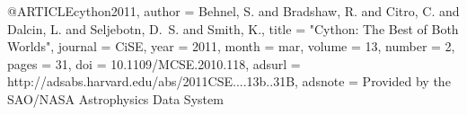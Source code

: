 
@ARTICLE{cython2011,
   author = {{Behnel}, S. and {Bradshaw}, R. and {Citro}, C. and {Dalcin}, L. and
	{Seljebotn}, D.~S. and {Smith}, K.},
    title = "{Cython: The Best of Both Worlds}",
  journal = {CiSE},
     year = 2011,
    month = mar,
   volume = 13,
   number = 2,
    pages = {31},
      doi = {10.1109/MCSE.2010.118},
   adsurl = {http://adsabs.harvard.edu/abs/2011CSE....13b..31B},
  adsnote = {Provided by the SAO/NASA Astrophysics Data System}
}
